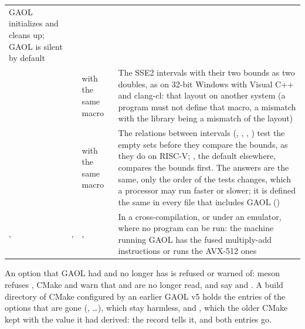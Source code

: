 \documentclass[12pt,a4paper,twoside,openright]{book}
\begin{document}
\begin{longtable}{L{3.5cm}L{3.2cm}L{3.3cm}L{3.8cm}}
    GAOL initializes and cleans up; GAOL is silent by default\\
     &
     &
     with the same macro & The SSE2 intervals with
    their two bounds as two doubles, as on 32-bit Windows with Visual C++ and
    clang-cl: that layout on another system (a program must not define that
    macro, a mismatch with the library being a mismatch of the layout)\\
     &  &  with the same macro & The
    relations between intervals (\code{<}, \code{<=}, \code{>}, \code{>=})
    test the empty sets before they compare the bounds, as they do on
    RISC-V; , the default elsewhere, compares the bounds first. The
    answers are the same, only the order of the tests changes, which a
    processor may run faster or slower; it is defined the same in every file
    that includes GAOL ()\\
    ,
     &
    ,
     &
    ,  &
    In a cross-compilation, or under an emulator, where no program can be
    run: the machine running GAOL has the fused multiply-add instructions or
    runs the AVX-512 ones\\
\end{longtable}
\endgroup

\begin{Rem}
An option that GAOL had and no longer has is refused or warned of: meson
refuses , CMake and  warn that
 and  are no longer read, and
say  and . A build directory of
CMake configured by an earlier GAOL v5 holds the entries of the options that
are gone (, \ldots), which stay
harmless, and , which the older CMake kept with
the value it had derived: the record 
tells it, and both entries go.
\end{Rem}
\end{document}
